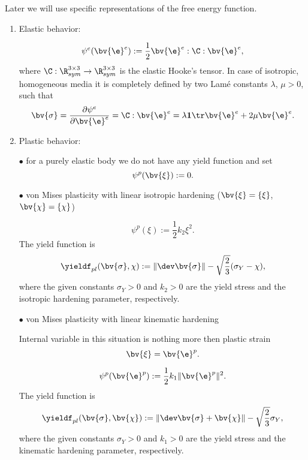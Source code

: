 \begin{remark}\label{remark:PlasticityLaw} Later we will use specific representations of the free energy function.

\begin{enumerate}
\item Elastic behavior:

\begin{equation} 
\psi^{e}(\bv{\e}^{e}):= \frac{1}{2}\bv{\e}^{e} : \C : \bv{\e}^{e},
\end{equation}
where $\C:\R^{3\times 3}_{sym}\rightarrow \R^{3\times 3}_{sym}$ is the  elastic Hooke's tensor. In case of isotropic, homogeneous media it is completely defined by two  Lam\'e constants $\lambda$, $\mu>0$, such that
\begin{equation} 
\bv{\sigma} =\frac{\partial \psi^{e} }{\partial \bv{\e}^{e}}=\C:\bv{\e}^{e}=\lambda \mathbf{1} \tr \bv{\e}^{e} + 2 \mu \bv{\e}^{e}.
\end{equation}

\item Plastic behavior:

\subitem  $\bullet$  for a purely elastic body we do not have any yield function and  set 
\begin{equation} 
\psi^{p}(\bv{\xi}):= 0.
\end{equation}

\subitem $\bullet$ von Mises plasticity with linear isotropic hardening ($\bv{\xi}=\{\xi\}$, $\bv{\chi}=\{\chi\}$)

\begin{equation} 
\psi^{p}(\xi):= \frac{1}{2}k_2 \xi^2.
\end{equation}
The yield function is 
\begin{equation} 
\yieldf_{pl}(\bv{\sigma},\chi):=\|\dev \bv{\sigma}\|-\sqrt{\frac{2}{3}}(\sigma_Y-\chi),
\end{equation}
where the given constants $\sigma_Y>0$ and $k_2>0$ are the yield stress and the isotropic hardening parameter, respectively. 

\subitem  $\bullet$ von Mises plasticity with linear kinematic hardening  

Internal variable in this situation is nothing more then plastic strain
\begin{equation} 
\bv{\xi}=\bv{\e}^{p}.
\end{equation}

\begin{equation} 
\psi^{p}(\bv{\e}^{p}):= \frac{1}{2}k_1 \|\bv{\e}^{p}\|^2.
\end{equation}
The yield function is 
\begin{equation} 
\yieldf_{pl}(\bv{\sigma},\bv{\chi}):=\|\dev \bv{\sigma}+\bv{\chi}\|-\sqrt{\frac{2}{3}}\sigma_Y,
\end{equation}
where the given constants $\sigma_Y>0$ and $k_1>0$ are the yield stress and the kinematic hardening parameter, respectively.


\end{enumerate}
\end{remark}
